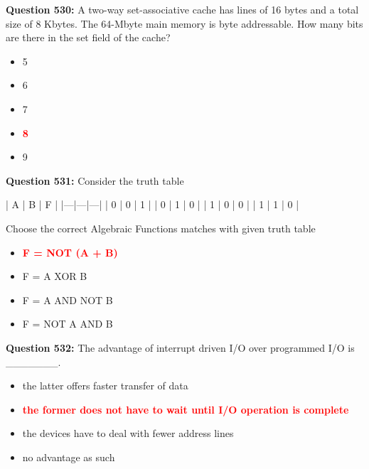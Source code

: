 \documentclass[12pt,a4paper]{article}
\begin{document}
\vspace{0.5cm}

\textbf{Question 530:} A two-way set-associative cache has lines of 16 bytes and a total size of 8 Kbytes. The 64-Mbyte main memory is byte addressable. How many bits are there in the set field of the cache?

\begin{itemize}
    \item[\textbf{A.}] 5
    \item[\textbf{B.}] 6
    \item[\textbf{C.}] 7
    \item[\textbf{D.}] \textcolor{red}{\textbf{8}}
    \item[\textbf{E.}] 9
\end{itemize}

\vspace{0.5cm}

\textbf{Question 531:} Consider the truth table

| A | B | F |
|---|---|---|
| 0 | 0 | 1 |
| 0 | 1 | 0 |
| 1 | 0 | 0 |
| 1 | 1 | 0 |

Choose the correct Algebraic Functions matches with given truth table

\begin{itemize}
    \item[\textbf{A.}] \textcolor{red}{\textbf{F = NOT (A + B)}}
    \item[\textbf{B.}] F = A XOR B
    \item[\textbf{C.}] F = A AND NOT B
    \item[\textbf{D.}] F = NOT A AND B
\end{itemize}

\vspace{0.5cm}

\textbf{Question 532:} The advantage of interrupt driven I/O over programmed I/O is _______.

\begin{itemize}
    \item[\textbf{A.}] the latter offers faster transfer of data
    \item[\textbf{B.}] \textcolor{red}{\textbf{the former does not have to wait until I/O operation is complete}}
    \item[\textbf{C.}] the devices have to deal with fewer address lines
    \item[\textbf{D.}] no advantage as such
\end{itemize}

\vspace{0.5cm}
\end{document}
